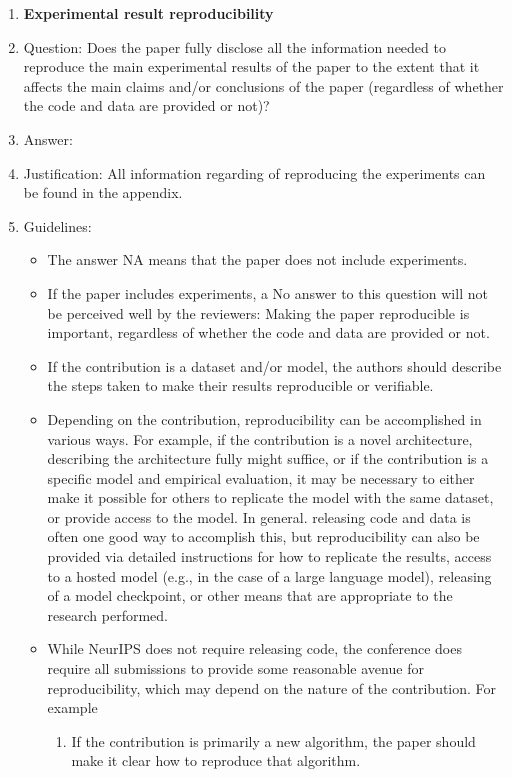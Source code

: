 \documentclass{article}
\theoremstyle{remark}
\begin{document}
\begin{enumerate}
    \item {\bf Experimental result reproducibility}
    \item[] Question: Does the paper fully disclose all the information needed to reproduce the main experimental results of the paper to the extent that it affects the main claims and/or conclusions of the paper (regardless of whether the code and data are provided or not)?
    \item[] Answer: \answerYes{} %
    \item[] Justification: All information regarding of reproducing the experiments can be found in the appendix.
    \item[] Guidelines:
    \begin{itemize}
        \item The answer NA means that the paper does not include experiments.
        \item If the paper includes experiments, a No answer to this question will not be perceived well by the reviewers: Making the paper reproducible is important, regardless of whether the code and data are provided or not.
        \item If the contribution is a dataset and/or model, the authors should describe the steps taken to make their results reproducible or verifiable. 
        \item Depending on the contribution, reproducibility can be accomplished in various ways. For example, if the contribution is a novel architecture, describing the architecture fully might suffice, or if the contribution is a specific model and empirical evaluation, it may be necessary to either make it possible for others to replicate the model with the same dataset, or provide access to the model. In general. releasing code and data is often one good way to accomplish this, but reproducibility can also be provided via detailed instructions for how to replicate the results, access to a hosted model (e.g., in the case of a large language model), releasing of a model checkpoint, or other means that are appropriate to the research performed.
        \item While NeurIPS does not require releasing code, the conference does require all submissions to provide some reasonable avenue for reproducibility, which may depend on the nature of the contribution. For example
        \begin{enumerate}
            \item If the contribution is primarily a new algorithm, the paper should make it clear how to reproduce that algorithm.

\end{enumerate}
\end{itemize}
\end{enumerate}
\end{document}

